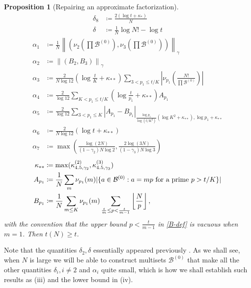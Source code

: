 \documentclass[12pt,a4paper,reqno]{amsart}
\numberwithin{equation}{section}
\theoremstyle{plain}
\newtheorem{proposition}[theorem]{Proposition}
\theoremstyle{definition}
\newcommand\tuple{{\mathcal B}}
\begin{document}
\begin{proposition}[Repairing an approximate factorization]
\begin{align}
\delta_8 &\coloneqq \frac{2(\log t + \kappa_*)}{N} \label{delta8-def}\\
\delta &\coloneqq \frac{1}{N} \log N! - \log t\label{delta-def}  
\end{align}
\begin{align}
\alpha_1 &\coloneqq \frac{1}{N} \left\| \left( \nu_{2}\left(\prod \tuple^{(0)}\right), \nu_{3}\left(\prod \tuple^{(0)}\right)\right) \right\|_\gamma \label{alpha1-def}  \\
\alpha_2 &\coloneqq \left\| (B_2, B_3) \right\|_\gamma \label{alpha2-def}  \\
\alpha_3 &\coloneqq \frac{2}{N\log 12} \left(\log \frac{t}{K} + \kappa_{**}\right) \sum_{3 < p_1 \leq t/K} \left|\nu_{p_1}\left( \frac{N!}{\prod \tuple^{(0)}} \right)\right| \label{alpha3-def}  \\
\alpha_4 &\coloneqq \frac{2}{\log 12} \sum_{K < p_1 \leq t/K} \left(\log \frac{t}{p_1} + \kappa_{**}\right) A_{p_1} \label{alpha4-def}  \\
\alpha_5 &\coloneqq \frac{2}{\log 12} \sum_{3 < p_1 \leq K} \left|A_{p_1} - B_{p_1}\right|_{\frac{\log p_1}{\log(t/K^2)} (\log K^2 + \kappa_{**}), \log p_1 + \kappa_{**}} \label{alpha5-def}  \\
\alpha_6 &\coloneqq \frac{2}{N\log 12} (\log t + \kappa_{**}) \label{alpha6-def}  \\
\alpha_7 &\coloneqq \max\left( \frac{\log(2N)}{(1-\gamma_2)N\log 2},  \frac{2\log(3N)}{(1-\gamma_3)N\log 3}\right)\label{alpha7-def}  
\end{align}
\begin{align}
\kappa_{**} &\coloneqq \max(\kappa^{(2)}_{4.5, \gamma_2}, \kappa^{(3)}_{4.5, \gamma_3}) \label{kappastar-def}  \\
A_{p_1} &\coloneqq \frac{1}{N} \sum_m \nu_{p_1}(m) | \{ a \in \tuple^{(0)}: a = mp \hbox{ for a prime } p > t/K \}| \label{A-def} \\
B_{p_1} &\coloneqq \frac{1}{N} \sum_{m \leq K} \nu_{p_1}(m) \sum_{\frac{t}{m} \leq p < \frac{t}{m-1}} \left \lfloor \frac{N}{p} \right\rfloor,\label{B-def} 
\end{align}
with the convention that the upper bound $p < \frac{t}{m-1}$ in \eqref{B-def} is vacuous when $m=1$.  Then $t(N) \geq t$.
\end{proposition}

Note that the quantities $\delta_2, \delta$ essentially appeared previously .  As we shall see, when $N$ is large we will be able to construct multisets $\tuple^{(0)}$ that make all the other quantities $\delta_i, i \neq 2$ and $\alpha_i$ quite small, which is how we shall establish such results as (iii) and the lower bound in (iv).
\end{document}

